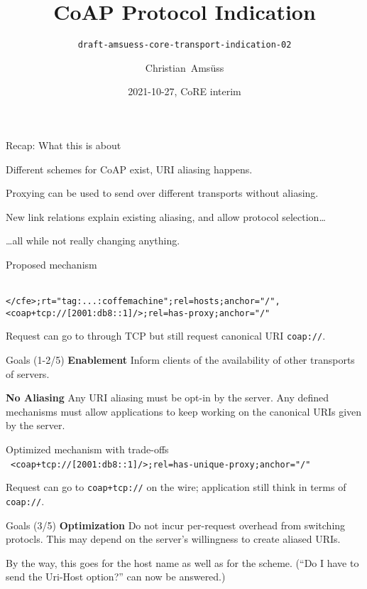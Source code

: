 \documentclass[aspectratio=169]{beamer}
\title{CoAP Protocol Indication}
\subtitle{\texttt{draft-amsuess-core-transport-indication-02}}
\author{Christian~Amsüss}
\date{2021-10-27, CoRE interim}
\begin{document}
\frame{\titlepage}

\begin{frame}{Recap: What this is about}\Large

	Different schemes for CoAP exist, URI aliasing happens.

	\bigskip

	Proxying can be used to send over different transports without aliasing.

	\bigskip

	New link relations explain existing aliasing, and allow protocol selection\ldots

	\bigskip

	\ldots all while not really changing anything.
\end{frame}

\begin{frame}{Proposed mechanism}\Large

	\mbox{}\\
	\texttt{</cfe>;rt="tag:...:coffemachine"}{\color{gray}\texttt{;rel=hosts;anchor="/"}}\texttt{,}\\
	\texttt{<coap+tcp://[2001:db8::1]/>;rel=}{\color{blue}\texttt{has-proxy}}{\color{gray}\texttt{;anchor="/"}}

	\bigskip

	Request can go to through TCP but still request canonical URI \texttt{coap://}.

	\bigskip

	\begin{block}{Goals (1-2/5)}
		\textbf{Enablement} Inform clients of the availability of other transports of servers.

		\textbf{No Aliasing} Any URI aliasing must be opt-in by the server. Any defined mechanisms must allow applications to keep working on the canonical URIs given by the server.
	\end{block}
\end{frame}

\begin{frame}{Optimized mechanism with trade-offs}\Large
	\mbox{}\\
	\mbox{
	\texttt{<coap+tcp://[2001:db8::1]/>;rel=}{\color{blue}\texttt{has-unique-proxy}}{\color{gray}\texttt{;anchor="/"}}
	}

	\bigskip

	Request can go to \texttt{coap+tcp://} on the wire; application still think in terms of \texttt{coap://}.

	\bigskip

	\begin{block}{Goals (3/5)}
		\textbf{Optimization} Do not incur per-request overhead from switching protocls. This may depend on the server's willingness to create aliased URIs.
	\end{block}

	\bigskip

	By the way, this goes for the host name as well as for the scheme.
	(``Do I have to send the Uri-Host option?'' can now be answered.)
\end{frame}
\end{document}
